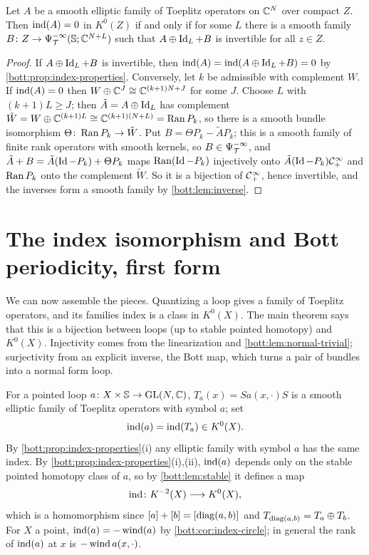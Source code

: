 \begin{proposition}\label{bott:prop:perturb}
  Let $A$ be a smooth elliptic family of Toeplitz operators on $\mathbb{C}^N$ over compact $Z$.
  Then $\operatorname{ind}(A)=0$ in $K^0(Z)$ if and only if for some $L$ there is a smooth family
  $B\colon Z\to\Psi^{-\infty}_{\mathcal{T}}(\mathbb{S};\mathbb{C}^{N+L})$ such that $A\oplus\operatorname{Id}_L+B$ is
  invertible for all $z\in Z$.
\end{proposition}
\begin{proof}
  If $A\oplus\operatorname{Id}_L+B$ is invertible, then $\operatorname{ind}(A)=\operatorname{ind}(A\oplus\operatorname{Id}_L+B)=0$ by
  \cref{bott:prop:index-properties}. Conversely, let $k$ be admissible with complement
  $W$. If $\operatorname{ind}(A)=0$ then $W\oplus\mathbb{C}^J\cong\mathbb{C}^{(k+1)N+J}$ for some $J$. Choose $L$ with
  $(k+1)L\ge J$; then $\tilde A=A\oplus\operatorname{Id}_L$ has complement
  $\tilde W=W\oplus\mathbb{C}^{(k+1)L}\cong\mathbb{C}^{(k+1)(N+L)}=\operatorname{Ran} P_k$, so there is a smooth bundle
  isomorphism $\Theta\colon\operatorname{Ran} P_k\to\tilde W$. Put $B=\Theta P_k-\tilde AP_k$; this is a
  smooth family of finite rank operators with smooth kernels, so $B\in\Psi^{-\infty}_{\mathcal{T}}$,
  and $\tilde A+B=\tilde A(\operatorname{Id}-P_k)+\Theta P_k$ maps $\operatorname{Ran}(\operatorname{Id}-P_k)$ injectively onto
  $\tilde A(\operatorname{Id}-P_k)\mathcal{C}^\infty_+$ and $\operatorname{Ran} P_k$ onto the complement $\tilde W$. So it is a
  bijection of $\mathcal{C}^\infty_+$, hence invertible, and the inverses form a smooth family by
  \cref{bott:lem:inverse}.
\end{proof}

\section[The index isomorphism]{The index isomorphism and Bott periodicity, first form}\label{bott:sec:index-iso}

We can now assemble the pieces. Quantizing a loop gives a family of Toeplitz
operators, and its families index is a class in $K^0(X)$. The main theorem says
that this is a bijection between loops (up to stable pointed homotopy) and
$K^0(X)$. Injectivity comes from the linearization and
\cref{bott:lem:normal-trivial}; surjectivity from an explicit inverse, the Bott
map, which turns a pair of bundles into a normal form loop.

For a pointed loop $a\colon X\times\mathbb{S}\to\operatorname{GL}(N,\mathbb{C})$, $T_a(x)=Sa(x,\cdot)S$ is a
smooth elliptic family of Toeplitz operators with symbol $a$; set
\begin{equation*}
  \operatorname{ind}(a)=\operatorname{ind}(T_a)\in K^0(X).
\end{equation*}
By \cref{bott:prop:index-properties}(i) any elliptic family with symbol $a$ has the same
index. By \cref{bott:prop:index-properties}(i),(ii), $\operatorname{ind}(a)$ depends only on the stable
pointed homotopy class of $a$, so by \cref{bott:lem:stable} it defines a map
\begin{equation*}
  \operatorname{ind}\colon K^{-2}(X)\longrightarrow K^0(X),
\end{equation*}
which is a homomorphism since $[a]+[b]=[\operatorname{diag}(a,b)]$ and $T_{\operatorname{diag}(a,b)}=T_a\oplus T_b$.
For $X$ a point, $\operatorname{ind}(a)=-\operatorname{wind}(a)$ by \cref{bott:cor:index-circle}; in general the
rank of $\operatorname{ind}(a)$ at $x$ is $-\operatorname{wind} a(x,\cdot)$.

